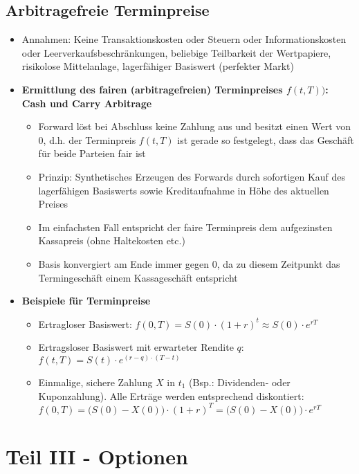 \subsection{Arbitragefreie Terminpreise}
\begin{itemize}
	\item Annahmen: Keine Transaktionskosten oder Steuern oder Informationskosten oder Leerverkaufsbeschränkungen, beliebige Teilbarkeit der Wertpapiere, risikolose Mittelanlage, lagerfähiger Basiswert (perfekter Markt)
	\item \textbf{Ermittlung des fairen (arbitragefreien) Terminpreises \(f(t,T))\): Cash und Carry Arbitrage}
	\begin{itemize}
		\item Forward löst bei Abschluss keine Zahlung aus und besitzt einen Wert von \(0\), d.h. der Terminpreis \(f(t,T)\) ist gerade so festgelegt, dass das Geschäft für beide Parteien fair ist
		\item Prinzip: Synthetisches Erzeugen des Forwards durch sofortigen Kauf des lagerfähigen Basiswerts sowie Kreditaufnahme in Höhe des aktuellen Preises
		\item Im einfachsten Fall entspricht der faire Terminpreis dem aufgezinsten Kassapreis (ohne Haltekosten etc.)
		\item Basis konvergiert am Ende immer gegen \(0\), da zu diesem Zeitpunkt das Termingeschäft einem Kassageschäft entspricht
	\end{itemize}
	\item \textbf{Beispiele für Terminpreise}
	\begin{itemize}
		\item Ertragloser Basiswert: \(f(0,T) = S(0)\cdot(1+r)^t \approx S(0) \cdot e^{rT}\)
		\item Ertragsloser Basiswert mit erwarteter Rendite \(q\): \(f(t,T) = S(t) \cdot e^{(r-q)\cdot (T-t)}\)
		\item Einmalige, sichere Zahlung \(X\) in \(t_1\) (Bsp.: Dividenden- oder Kuponzahlung). Alle Erträge werden entsprechend diskontiert: \(f(0,T) = \big(S(0)-X(0)\big)\cdot (1+r)^T = \big(S(0)-X(0)\big)\cdot e^{rT}\)
	\end{itemize}
\end{itemize}



\section{Teil III - Optionen}

